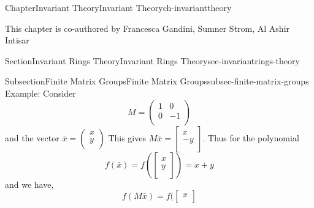 \documentclass[oneside,10pt,]{book}
\newcommand{\amp}{&}
\begin{document}
\raggedbottom
%
%
\typeout{************************************************}
\typeout{************************************************}
%
\begin{chapterptx}{Chapter}{Invariant Theory}{}{Invariant Theory}{}{}{ch-invarianttheory}
\renewcommand*{\chaptername}{Chapter}
\begin{introduction}{}%
This chapter is co-authored by Francesca Gandini, Sumner Strom, Al Ashir Intisar%
\end{introduction}%
%
%
\typeout{************************************************}
\typeout{************************************************}
%
\begin{sectionptx}{Section}{Invariant Rings Theory}{}{Invariant Rings Theory}{}{}{sec-invariantrings-theory}
%
%
\typeout{************************************************}
\typeout{************************************************}
%
\begin{subsectionptx}{Subsection}{Finite Matrix Groups}{}{Finite Matrix Groups}{}{}{subsec-finite-matrix-groups}
Example: Consider%
\begin{equation*}
M =  \begin{pmatrix}
1 \amp 0 \\
0 \amp -1 \\
\end{pmatrix} 
\end{equation*}
and the vector \(\bar x = \begin{pmatrix} x\\ y\\ \end{pmatrix}\) This gives \(M \bar x = \begin{bmatrix}
x \\
-y  \\
\end{bmatrix}\). Thus for the polynomial%
\begin{equation*}
f(\bar x) = f(\begin{bmatrix}
x \\
y  \\
\end{bmatrix}) = x+y
\end{equation*}
and we have,%
\begin{equation*}
f(M\bar x) = f(\begin{bmatrix}
x \\

\end{bmatrix}
\end{equation*}
\end{subsectionptx}
\end{sectionptx}
\end{chapterptx}
\end{document}
